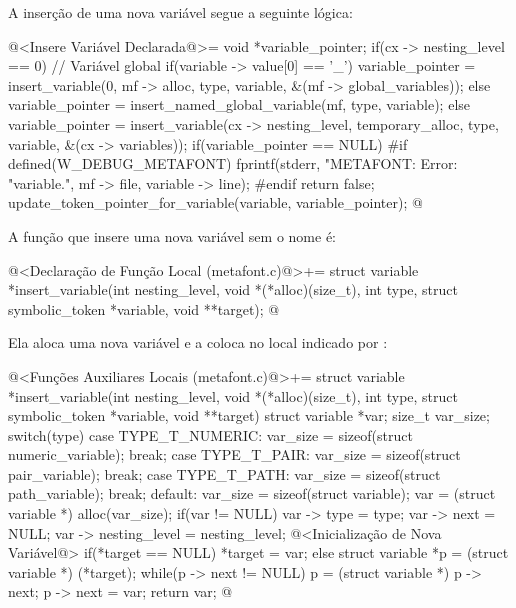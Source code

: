 A inserção de uma nova variável segue a seguinte lógica:

\iniciocodigo
@<Insere Variável Declarada@>=
{
  void *variable_pointer;
  if(cx -> nesting_level == 0){ // Variável global
    if(variable -> value[0] == '_')
      variable_pointer = insert_variable(0, mf -> alloc, type, variable,
                                         &(mf -> global_variables));
    else
      variable_pointer = insert_named_global_variable(mf, type, variable);
  }
  else
    variable_pointer = insert_variable(cx -> nesting_level,
                                      temporary_alloc, type,
                                      variable, &(cx -> variables));
  if(variable_pointer == NULL){
#if defined(W_DEBUG_METAFONT)
      fprintf(stderr, "METAFONT: Error: %
                    "variable.\n", mf -> file, variable -> line);
#endif
    return false;
  }
  update_token_pointer_for_variable(variable, variable_pointer);
}
@
\fimcodigo

A função que insere uma nova variável sem o nome é:

\iniciocodigo
@<Declaração de Função Local (metafont.c)@>+=
struct variable *insert_variable(int nesting_level,
                                 void *(*alloc)(size_t),
                                 int type,
                                 struct symbolic_token *variable,
                                 void **target);
@
\fimcodigo

Ela aloca uma nova variável e a coloca no local indicado
por :

\iniciocodigo
@<Funções Auxiliares Locais (metafont.c)@>+=
struct variable *insert_variable(int nesting_level,
                                 void *(*alloc)(size_t),
                                 int type,
                                 struct symbolic_token *variable,
                                 void **target){
  struct variable *var;
  size_t var_size;
  switch(type){
    case TYPE_T_NUMERIC:
      var_size = sizeof(struct numeric_variable);
      break;
    case TYPE_T_PAIR:
      var_size = sizeof(struct pair_variable);
      break;
    case TYPE_T_PATH:
      var_size = sizeof(struct path_variable);
      break;
    default:
      var_size = sizeof(struct variable);
  }
  var = (struct variable *) alloc(var_size);
  if(var != NULL){
    var -> type = type;
    var -> next = NULL;
    var -> nesting_level = nesting_level;
    @<Inicialização de Nova Variável@>
  }
  if(*target == NULL)
    *target = var;
  else{
    struct variable *p = (struct variable *) (*target);
    while(p -> next != NULL)
      p = (struct variable *) p -> next;
    p -> next = var;
  }
  return var;
}
@
\fimcodigo

